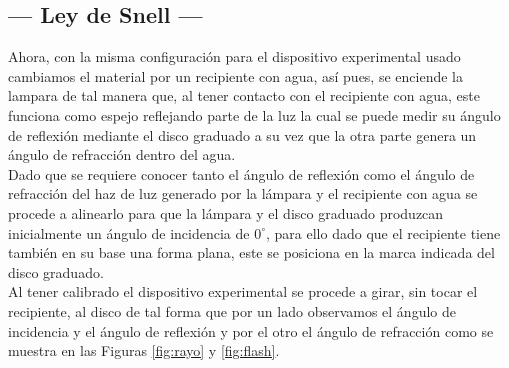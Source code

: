 \documentclass[12pt,a4paper]{article}
\begin{document}
\subsection{--- Ley de Snell ---} %
\label{sub:ley_snell_metodo}
Ahora, con la misma configuración para el dispositivo experimental usado cambiamos el material por un recipiente con agua, así pues, se enciende la lampara de tal manera que, al tener contacto con el recipiente con agua, este funciona como espejo reflejando parte de la luz la cual se puede medir su ángulo de reflexión mediante el disco graduado a su vez que la otra parte genera un ángulo de refracción dentro del agua. \\[2mm]
Dado que se requiere conocer tanto el ángulo de reflexión como el ángulo de refracción del haz de luz generado por la lámpara y el recipiente con agua se procede a alinearlo para que la lámpara y el disco graduado produzcan inicialmente un ángulo de incidencia de \(0^ \circ\), para ello dado que el recipiente tiene también en su base una forma plana, este se posiciona en la marca indicada del disco graduado. \\[2mm]
Al tener calibrado el dispositivo experimental se procede a girar, sin tocar el recipiente, al disco de tal forma que por un lado observamos el ángulo de incidencia y el ángulo de reflexión y por el otro el ángulo de refracción como se muestra en las Figuras \ref{fig:rayo} y \ref{fig:flash}.
\end{document}
